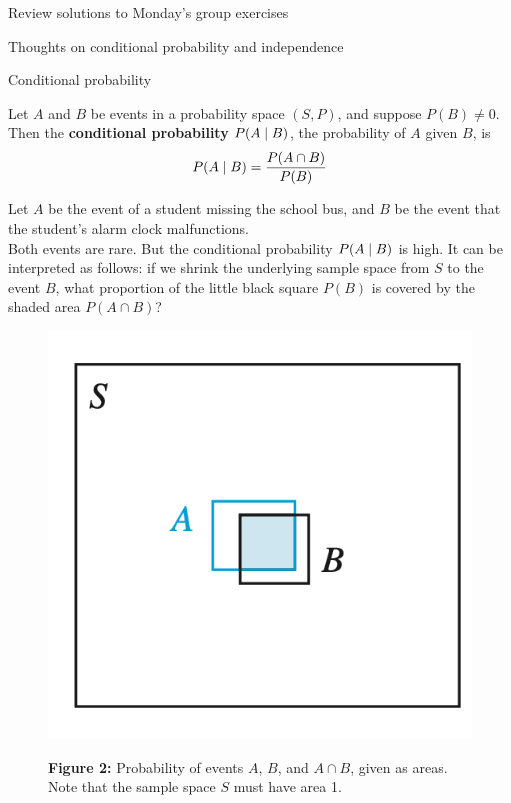 \documentclass[10pt]{beamer}
\begin{document}

\begin{frame}[standout]
Review solutions to Monday's group exercises
\end{frame}


\begin{frame}[standout]
Thoughts on conditional probability and independence
\end{frame}



\begin{frame}{Conditional probability}
\footnotesize 
\begin{mygreenbox}[title=\text{Definition}]
Let $A$ and $B$ be events in a probability space $(S,P)$, and suppose $P(B) \neq 0$.  Then the \textbf{conditional probability} $ P(A \; | \; B)$, the probability of $A$ given $B$, is 
\[ P(A \; | \; B) = \frac{P(A \cap B)}{ P(B)} \]
\end{mygreenbox}

\begin{myredbox}[title=Example]

\begin{minipage}{.45\textwidth}
Let $A$ be the event of a student missing the school bus, and $B$ be the event that the student's alarm clock malfunctions. \\

Both events are rare.  But the conditional probability $P(A \; | \; B)$ is high.  It can be interpreted as follows: if we shrink the underlying sample space from $S$  to the event $B$, what proportion of the little black square $P(B)$ is covered by the shaded area $P(A \cap B)$? 
\end{minipage} %
\hfill 
\begin{minipage}{.45\textwidth}
\begin{figure}
\begin{center}
\includegraphics[width=.6\textwidth]{images/conditional_prob.png}
\end{center}
%	
\footnotesize \textbf{Figure 2:} Probability of events $A$, $B$, and $A \cap B$, given as areas. Note that the sample space $S$ must have area 1.
\end{figure}
\end{minipage} %
   

\end{myredbox}
\end{frame}
\end{document}
